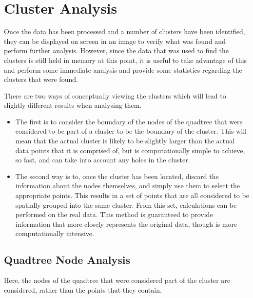 
\section{Cluster Analysis}
\label{sec:cluster_analysis}

Once the data has been processed and a number of clusters have been identified,
they can be displayed on screen in an image to verify what was found and
perform further analysis. However, since the data that was used to find the
clusters is still held in memory at this point, it is useful to take advantage
of this and perform some immediate analysis and provide some statistics
regarding the clusters that were found.

There are two ways of conceptually viewing the clusters which will lead to
slightly different results when analysing them.

\begin{itemize}

	\item The first is to consider the boundary of the nodes of the quadtree
		that were considered to be part of a cluster to be the boundary of the
		cluster. This will mean that the actual cluster is likely to be
		slightly larger than the actual data points that it is comprised of,
		but is computationally simple to achieve, so fast, and can take into
		account any holes in the cluster.

	\item The second way is to, once the cluster has been located, discard the
		information about the nodes themselves, and simply use them to select
		the appropriate points. This results in a set of points that are all
		considered to be spatially grouped into the same cluster. From this
		set, calculations can be performed on the real data. This method is
		guaranteed to provide information that more closely represents the
		original data, though is more computationally intensive.

\end{itemize}

\subsection{Quadtree Node Analysis}
\label{sub:quadtree_node_analysis}

Here, the nodes of the quadtree that were considered part of the cluster are
considered, rather than the points that they contain.

